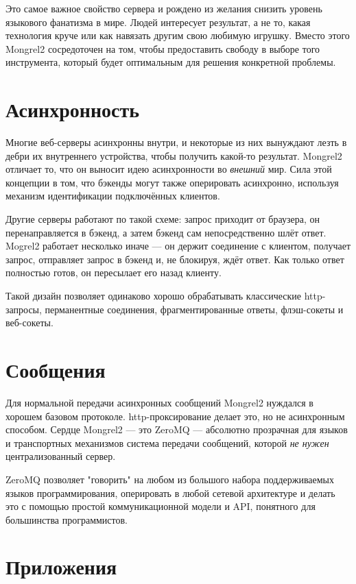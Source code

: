 Это самое важное свойство сервера и рождено из желания снизить уровень языкового фанатизма
в мире. Людей интересует результат, а не то, какая технология круче или как навязать
другим свою любимую игрушку. Вместо этого Mongrel2 сосредоточен на том, чтобы
предоставить свободу в выборе того инструмента, который будет оптимальным для решения
конкретной проблемы.

\section{Асинхронность}

Многие веб-серверы асинхронны внутри, и некоторые из них вынуждают лезть в дебри их
внутреннего устройства, чтобы получить какой-то результат. Mongrel2 отличает то,
что он выносит идею асинхронности во \emph{внешний} мир. Сила этой концепции в том,
что бэкенды могут также оперировать асинхронно, используя механизм идентификации
подключённых клиентов.

Другие серверы работают по такой схеме: запрос приходит от браузера, он перенаправляется
в бэкенд, а затем бэкенд сам непосредственно шлёт ответ. Mogrel2 работает несколько иначе ---
он держит соединение с клиентом, получает запрос, отправляет запрос в бэкенд и, не блокируя,
ждёт ответ. Как только ответ полностью готов, он пересылает его назад клиенту.

Такой дизайн позволяет одинаково хорошо обрабатывать классические http-запросы, перманентные
соединения, фрагментированные ответы, флэш-сокеты и веб-сокеты.

\section{Сообщения}

Для нормальной передачи асинхронных сообщений Mongrel2 нуждался в хорошем базовом
протоколе. http-проксирование делает это, но не асинхронным способом.
Сердце Mongrel2 --- это ZeroMQ --- абсолютно прозрачная для языков и
транспортных механизмов система передачи сообщений, которой \emph{не нужен}
централизованный сервер.

ZeroMQ позволяет "говорить" на любом из большого набора поддерживаемых языков
программирования, оперировать в любой сетевой архитектуре и делать это с помощью
простой коммуникационной модели и API, понятного для большинства программистов.

\section{Приложения}

